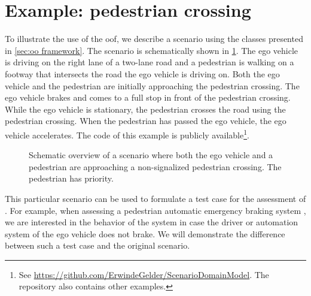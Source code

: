 \section{Example: pedestrian crossing}
\label{sec:example}

To illustrate the use of the \cstartb \ac{oof}\cendb, we describe a scenario using the \cstartb classes \cendb presented in \cref{sec:oo framework}. The scenario is schematically shown in \cref{fig:scenario overview}. The ego vehicle is driving on the right lane of a two-lane road and a pedestrian is walking on a footway that intersects the road the ego vehicle is driving on. Both the ego vehicle and the pedestrian are initially approaching the pedestrian crossing. The ego vehicle brakes and comes to a full stop in front of the pedestrian crossing. While the ego vehicle is stationary, the pedestrian crosses the road using the pedestrian crossing. When the pedestrian has passed the ego vehicle, the ego vehicle accelerates. The code of this example is publicly available\footnote{See \url{https://github.com/ErwindeGelder/ScenarioDomainModel}. The repository also contains other examples.}.

\setlength{\figurewidth}{0.6\linewidth}
\begin{figure}[t]
	\centering
	
	\caption{Schematic overview of a scenario where both the ego vehicle and a pedestrian are approaching a non-signalized pedestrian crossing. The pedestrian has priority. 
	}
	\label{fig:scenario overview}
\end{figure}


\cstartc This particular scenario can be used to formulate a test case for the assessment of . For example, when assessing a pedestrian automatic emergency braking system \autocite{seiniger2015test}, we are interested in the behavior of the system in case the driver or automation system of the ego vehicle does not brake. We will demonstrate the difference between such a test case and the original scenario. \cendc


